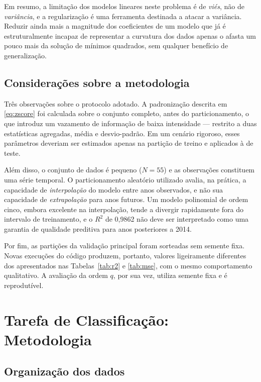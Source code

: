 \documentclass[conference]{IEEEtran}
\begin{document}
Em resumo, a limitação dos modelos lineares neste problema é de \textit{viés},
não de \textit{variância}, e a regularização é uma ferramenta destinada a atacar
a variância. Reduzir ainda mais a magnitude dos coeficientes de um modelo que já
é estruturalmente incapaz de representar a curvatura dos dados apenas o afasta um
pouco mais da solução de mínimos quadrados, sem qualquer benefício de
generalização.

\subsection{Considerações sobre a metodologia}

Três observações sobre o protocolo adotado. A padronização descrita em
\eqref{eq:zscore} foi calculada sobre o conjunto completo, antes do
particionamento, o que introduz um vazamento de informação de baixa intensidade
--- restrito a duas estatísticas agregadas, média e desvio-padrão. Em um cenário
rigoroso, esses parâmetros deveriam ser estimados apenas na partição de treino e
aplicados à de teste.

Além disso, o conjunto de dados é pequeno ($N = 55$) e as observações constituem
uma série temporal. O particionamento aleatório utilizado avalia, na prática, a
capacidade de \textit{interpolação} do modelo entre anos observados, e não sua
capacidade de \textit{extrapolação} para anos futuros. Um modelo polinomial de
ordem cinco, embora excelente na interpolação, tende a divergir rapidamente fora
do intervalo de treinamento, e o $R^2$ de 0,9862 não deve ser interpretado como
uma garantia de qualidade preditiva para anos posteriores a 2014.

Por fim, as partições da validação principal foram sorteadas sem semente fixa.
Novas execuções do código produzem, portanto, valores ligeiramente diferentes
dos apresentados nas Tabelas~\ref{tab:r2} e \ref{tab:mse}, com o mesmo
comportamento qualitativo. A avaliação da ordem $q$, por sua vez, utiliza
semente fixa e é reprodutível.

\section{Tarefa de Classificação: Metodologia}
\label{sec:cls-met}

\subsection{Organização dos dados}
\end{document}
